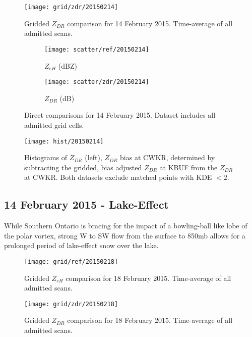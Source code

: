 \begin{figure}[p]
\texttt{[image: grid/zdr/20150214]}
\caption{Gridded $Z_{DR}$ comparison for 14 February 2015. Time-average of all admitted scans.} 
\label{fig:grid_zdr_20150214}
\end{figure}

\begin{figure}[p]
\centering
   \begin{subfigure}{0.49\linewidth} \centering
     \texttt{[image: scatter/ref/20150214]}
     \caption{$Z_{eH}$ (dBZ)}\label{fig:scatter_ref_20150214}
   \end{subfigure}
   \begin{subfigure}{0.49\linewidth} \centering
     \texttt{[image: scatter/zdr/20150214]}
     \caption{$Z_{DR}$ (dB)}\label{fig:scatter_zdr_20150214}
   \end{subfigure}
\caption{Direct comparisons for 14 February 2015. Dataset includes all admitted grid cells.} \label{fig:scatter_20150214}
\end{figure}

\begin{figure}[p]
\texttt{[image: hist/20150214]}\centering
\caption{Histograms of $Z_{DR}$ (left), $Z_{DR}$ bias at CWKR, determined by subtracting the gridded, bias adjusted $Z_{DR}$ at KBUF from the $Z_{DR}$ at CWKR. Both datasets exclude matched points with KDE $< 2$. } 
\label{fig:hist_20150214}
\end{figure}


\subsection{14 February 2015 - Lake-Effect}
While Southern Ontario is bracing for the impact of a bowling-ball like lobe of the polar vortex, strong W to SW flow from the surface to 850mb allows for a prolonged period of lake-effect snow over the lake. 
\begin{figure}[p]
\texttt{[image: grid/ref/20150218]}
\caption{Gridded $Z_{eH}$ comparison for 18 February 2015. Time-average of all admitted scans.} 
\label{fig:grid_ref_20150218}
\end{figure}

\begin{figure}[p]
\texttt{[image: grid/zdr/20150218]}
\caption{Gridded $Z_{DR}$ comparison for 18 February 2015. Time-average of all admitted scans.} 
\label{fig:grid_zdr_20150218}
\end{figure}

